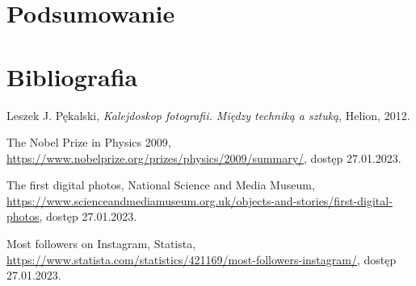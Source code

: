 \documentclass[a4paper, 12pt]{article}
\numberwithin{figure}{section}
\begin{document}
\begin{sloppypar}

\newpage 

\section{Podsumowanie}


\newpage 

%
    \listoffigures
    \clearpage


\newpage 

%
    \listoftables
    \clearpage


\newpage 

%
    \listofcodes
    \clearpage


\newpage 

\section*{Bibliografia}
    \renewcommand{\section}[2]{}
    
\begin{thebibliography}{99}

    Leszek J. Pękalski,
    \textit{Kalejdoskop fotografii. Między techniką a sztuką},
    Helion,
    2012.

    The Nobel Prize in Physics 2009,
    \url{https://www.nobelprize.org/prizes/physics/2009/summary/}, 
    dostęp 27.01.2023.

    The first digital photos, National Science and Media Museum,
    \url{https://www.scienceandmediamuseum.org.uk/objects-and-stories/first-digital-photos},
    dostęp 27.01.2023.

    Most followers on Instagram, Statista,
    \url{https://www.statista.com/statistics/421169/most-followers-instagram/},
    dostęp 27.01.2023.


\end{thebibliography}
\end{sloppypar}
\end{document}
